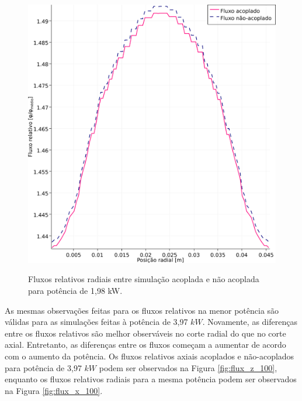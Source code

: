 \begin{figure}[htb]
  \caption{Fluxos relativos radiais entre simulação acoplada e não acoplada para
    potência de 1,98 kW.}
  \centering\includegraphics[scale=0.5]{figuras/Flux_rel_x_50_port.png}
  \label{fig:flux_x_50}
\end{figure}

As mesmas observações feitas para os fluxos relativos na menor potência são válidas
para as simulações feitas à potência de 3,97 $kW$. Novamente, as diferenças entre
os fluxos relativos são melhor observáveis no corte radial do que no corte axial.
Entretanto, as diferenças entre os fluxos começam a aumentar de acordo com o
aumento da potência. Os fluxos relativos axiais acoplados e não-acoplados para
potência de 3,97 $kW$ podem ser observados na Figura \ref{fig:flux_z_100}, enquanto
os fluxos relativos radiais para a mesma potência podem ser observados na Figura \ref{fig:flux_x_100}.

